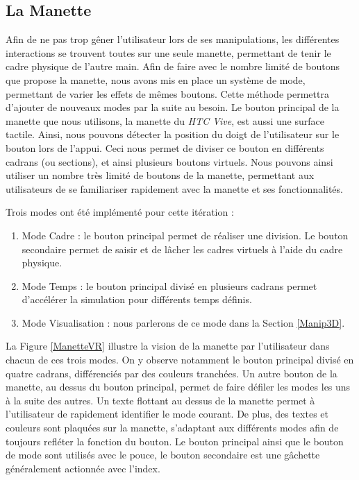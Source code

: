 		\subsection{La Manette}		
		Afin de ne pas trop gêner l'utilisateur lors de ses manipulations, les différentes interactions se trouvent toutes sur une seule manette, permettant de tenir le cadre physique de l'autre main. Afin de faire avec le nombre limité de boutons que propose la manette, nous avons mis en place un système de mode, permettant de varier les effets de mêmes boutons. Cette méthode permettra d'ajouter de nouveaux modes par la suite au besoin. 		
		Le bouton principal de la manette que nous utilisons, la manette du \textit{HTC Vive}, est aussi une surface tactile. Ainsi, nous pouvons détecter la position du doigt de l'utilisateur sur le bouton lors de l'appui. Ceci nous permet de diviser ce bouton en différents cadrans (ou sections), et ainsi plusieurs boutons virtuels. Nous pouvons ainsi utiliser un nombre très limité de boutons de la manette, permettant aux utilisateurs de se familiariser rapidement avec la manette et ses fonctionnalités. 
		
		Trois modes ont été implémenté pour cette itération :		
		\begin{enumerate}
			\item Mode Cadre : le bouton principal permet de réaliser une division. Le bouton secondaire permet de saisir et de lâcher les cadres virtuels à l'aide du cadre physique.
			\item Mode Temps : le bouton principal divisé en plusieurs cadrans permet d'accélérer la simulation pour différents temps définis.
			\item Mode Visualisation : nous parlerons de ce mode dans la Section \ref{Manip3D}.
		\end{enumerate}
		
		La Figure \ref{ManetteVR} illustre la vision de la manette par l'utilisateur dans chacun de ces trois modes. On y observe notamment le bouton principal divisé en quatre cadrans, différenciés par des couleurs tranchées. Un autre bouton de la manette, au dessus du bouton principal, permet de faire défiler les modes les uns à la suite des autres. Un texte flottant au dessus de la manette permet à l'utilisateur de rapidement identifier le mode courant. De plus, des textes et couleurs sont plaquées sur la manette, s'adaptant aux différents modes afin de toujours refléter la fonction du bouton. Le bouton principal ainsi que le bouton de mode sont utilisés avec le pouce, le bouton secondaire est une gâchette généralement actionnée avec l'index.
		
